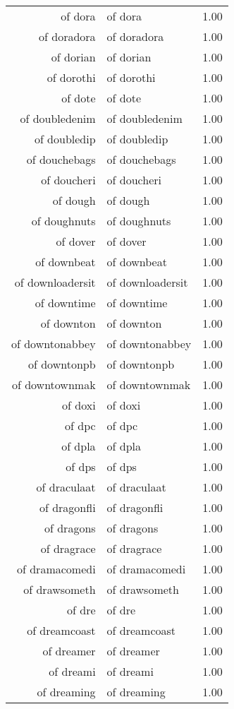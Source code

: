 \begin{table}[ht]
\begin{tabular}{rlr}
  of dora & of dora & 1.00 \\ 
  of doradora & of doradora & 1.00 \\ 
  of dorian & of dorian & 1.00 \\ 
  of dorothi & of dorothi & 1.00 \\ 
  of dote & of dote & 1.00 \\ 
  of doubledenim & of doubledenim & 1.00 \\ 
  of doubledip & of doubledip & 1.00 \\ 
  of douchebags & of douchebags & 1.00 \\ 
  of doucheri & of doucheri & 1.00 \\ 
  of dough & of dough & 1.00 \\ 
  of doughnuts & of doughnuts & 1.00 \\ 
  of dover & of dover & 1.00 \\ 
  of downbeat & of downbeat & 1.00 \\ 
  of downloadersit & of downloadersit & 1.00 \\ 
  of downtime & of downtime & 1.00 \\ 
  of downton & of downton & 1.00 \\ 
  of downtonabbey & of downtonabbey & 1.00 \\ 
  of downtonpb & of downtonpb & 1.00 \\ 
  of downtownmak & of downtownmak & 1.00 \\ 
  of doxi & of doxi & 1.00 \\ 
  of dpc & of dpc & 1.00 \\ 
  of dpla & of dpla & 1.00 \\ 
  of dps & of dps & 1.00 \\ 
  of draculaat & of draculaat & 1.00 \\ 
  of dragonfli & of dragonfli & 1.00 \\ 
  of dragons & of dragons & 1.00 \\ 
  of dragrace & of dragrace & 1.00 \\ 
  of dramacomedi & of dramacomedi & 1.00 \\ 
  of drawsometh & of drawsometh & 1.00 \\ 
  of dre & of dre & 1.00 \\ 
  of dreamcoast & of dreamcoast & 1.00 \\ 
  of dreamer & of dreamer & 1.00 \\ 
  of dreami & of dreami & 1.00 \\ 
  of dreaming & of dreaming & 1.00 \\ 

\end{tabular}
\end{table}
